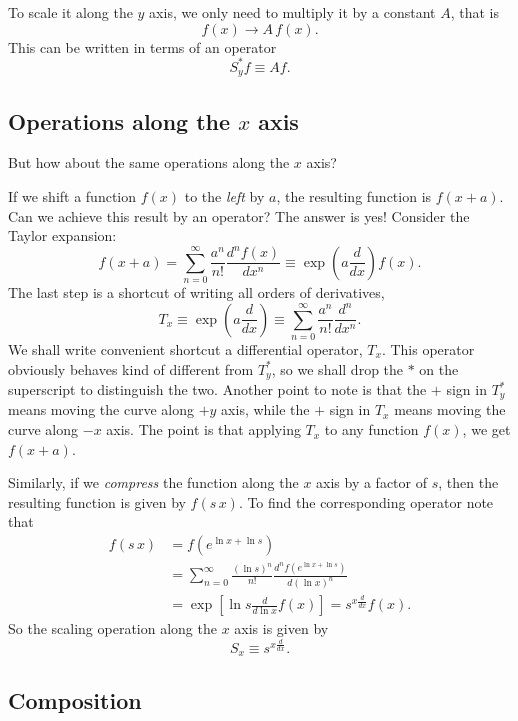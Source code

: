 \documentclass{article}
\begin{document}
To scale it along the $y$ axis, we only need to multiply it
by a constant $A$, that is
\begin{equation}
  f(x) \rightarrow A \, f(x).
  \label{eq:ys_scale}
\end{equation}
This can be written in terms of an operator
\begin{equation}
  S_y^* f \equiv A f.
  \label{eq:ys_scale2}
\end{equation}


\subsection{Operations along the $x$ axis}

But how about the same operations along the $x$ axis?

If we shift a function $f(x)$ to the \emph{left} by $a$,
the resulting function is $f(x + a)$.
Can we achieve this result by an operator?
The answer is yes!
Consider the Taylor expansion:
$$
f(x + a) = \sum_{n = 0}^\infty \frac{a^n}{n!} \frac{d^n f(x) }{dx^n}
\equiv \exp\left(a \frac{d}{dx} \right) f(x).
$$
The last step is a shortcut of
writing all orders of derivatives,
$$
T_x \equiv
\exp\left(a \frac{d}{dx} \right)
\equiv
\sum_{n = 0}^\infty \frac{a^n}{n!} \frac{d^n }{ dx^n}.
$$
We shall write convenient shortcut
a differential operator, $T_x$.
%
This operator obviously behaves kind of different from $T_y^*$,
so we shall drop the $*$ on the superscript to distinguish
the two.
%
Another point to note is that the $+$ sign in $T_y^*$
means moving the curve along $+y$ axis,
while the $+$ sign in $T_x$ means
moving the curve along $-x$ axis.
%
The point is that
applying $T_x$ to any function $f(x)$, we get $f(x+a)$.

Similarly, if we \emph{compress} the function along the $x$ axis by a factor of $s$,
then the resulting function is given by $f(s \, x)$.
To find the corresponding operator note that
$$
\begin{aligned}
f(s \, x)
&= f( e^{\ln x + \ln s} ) \\
&= \sum_{n = 0}^\infty \frac{(\ln s)^n}{n!} \frac{d^n f(e^{\ln x + \ln s}) }{ d(\ln x)^n } \\
&= \exp\left[ \ln s \frac{d}{d\ln x} f(x) \right]
= s^{x \frac{d}{dx} } f(x).
\end{aligned}
$$
So the scaling operation along the $x$ axis is given by
$$
S_x \equiv s^{x \frac{d}{dx} }.
$$



\subsection{Composition}
\end{document}
